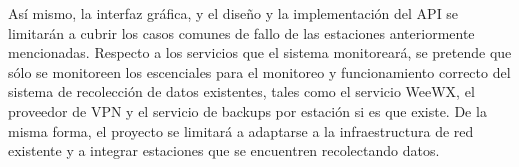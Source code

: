 Así mismo, la interfaz gráfica, y el diseño y la implementación del API se limitarán a cubrir los casos comunes de fallo de las estaciones anteriormente mencionadas. Respecto a los servicios que el sistema monitoreará, se pretende que sólo se monitoreen los escenciales para el monitoreo y funcionamiento correcto del sistema de recolección de datos existentes, tales como el servicio WeeWX, el proveedor de VPN y el servicio de backups por estación si es que existe. De la misma forma, el proyecto se limitará a adaptarse a la infraestructura de red existente y a integrar estaciones que se encuentren recolectando datos.
